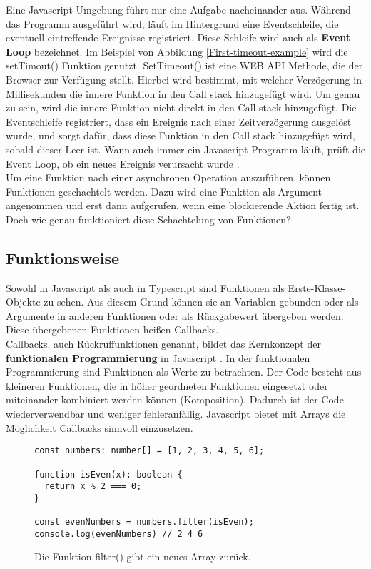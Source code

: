 \noindent
Eine Javascript Umgebung führt nur eine Aufgabe nacheinander aus. Während das Programm ausgeführt wird, läuft im Hintergrund eine Eventschleife, die eventuell eintreffende Ereignisse registriert. Diese Schleife wird auch als \textbf{Event Loop} bezeichnet. Im Beispiel von Abbildung \ref{First-timeout-example} wird die setTimout() Funktion genutzt. SetTimeout() ist eine WEB API Methode, die der Browser zur Verfügung stellt. Hierbei wird bestimmt, mit welcher Verzögerung in Millisekunden die innere Funktion in den Call stack hinzugefügt wird. Um genau zu sein, wird die innere Funktion nicht direkt in den Call stack hinzugefügt. Die Eventschleife registriert, dass ein Ereignis nach einer Zeitverzögerung ausgelöst wurde, und sorgt dafür, dass diese Funktion in den Call stack hinzugefügt wird, sobald dieser Leer ist. Wann auch immer ein Javascript Programm läuft, prüft die Event Loop, ob ein neues Ereignis verursacht wurde \cite{regular-event-loop}.\\

\noindent
Um eine Funktion nach einer asynchronen Operation auszuführen, können Funktionen geschachtelt werden. Dazu wird eine Funktion als Argument angenommen und erst dann aufgerufen, wenn eine blockierende Aktion fertig ist. Doch wie genau funktioniert diese Schachtelung von Funktionen?

\subsection{Funktionsweise}

Sowohl in Javascript als auch in Typescript sind Funktionen als Erste-Klasse-Objekte zu sehen. Aus diesem Grund können sie an Variablen gebunden oder als Argumente in anderen Funktionen oder als Rückgabewert übergeben werden. Diese übergebenen Funktionen heißen Callbacks.\\

\noindent
Callbacks, auch Rückruffunktionen genannt, bildet das Kernkonzept der \textbf{funktionalen Programmierung} in Javascript \cite{callbacks-intro}. In der funktionalen Programmierung sind Funktionen als Werte zu betrachten. Der Code besteht aus kleineren Funktionen, die in höher geordneten Funktionen eingesetzt oder miteinander kombiniert werden können (Komposition). Dadurch ist der Code wiederverwendbar und weniger fehleranfällig. Javascript bietet mit Arrays die Möglichkeit Callbacks sinnvoll einzusetzen.

\begin{figure}[H]
\begin{lstlisting}[basicstyle=\small]
const numbers: number[] = [1, 2, 3, 4, 5, 6];

function isEven(x): boolean { 
  return x % 2 === 0; 
}

const evenNumbers = numbers.filter(isEven);
console.log(evenNumbers) // 2 4 6
\end{lstlisting}
\caption{Die Funktion filter() gibt ein neues Array zurück.}
\label{callbacks-with-arrays}
\end{figure}

